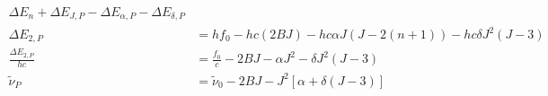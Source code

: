 \documentclass[titlepage]{article}
\begin{document}
\begin{figure}[hbtp]
\begin{align*}
        \Delta E_{n} + \Delta E_{J, P}
        - \Delta E_{\alpha, P}
        - \Delta E_{\delta, P} \\
        \Delta E_{2, P}  &= 
        hf_{0} -hc\left(2BJ\right) - hc \alpha J \left(
            J - 2\left(n + 1\right)
        \right)
        - h c \delta J^2 \left(
            J - 3
        \right) \\
        \frac{\Delta E_{2, P}}{hc} 
        &= \frac{f_0}{c} - 2BJ - \alpha J^2
        - \delta J^2\left(J-3\right) \\
        \tilde{\nu}_{P} &= \tilde{\nu}_0
        - 2BJ - J^2 \left[
            \alpha + \delta\left(
                J-3
            \right)
        \right] \quad  \\
    \end{align*}
\end{figure}
\end{document}
